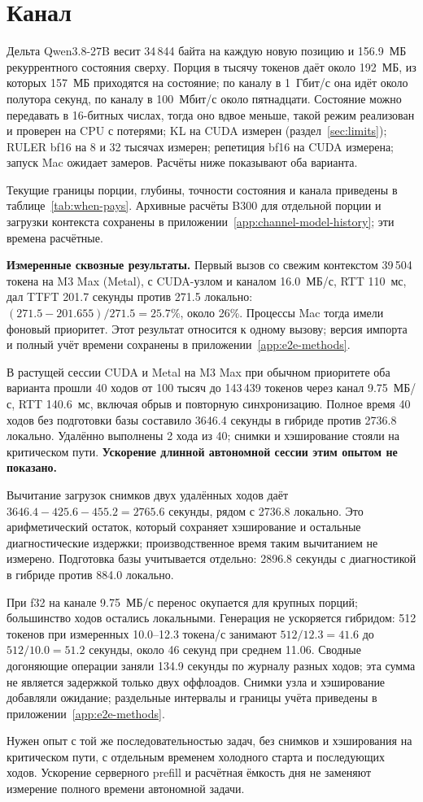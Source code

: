 \section{Канал}
\label{sec:channel}

Дельта Qwen3.8-27B весит 34\,844 байта на каждую новую позицию и 156.9~МБ рекуррентного состояния сверху. Порция в
тысячу токенов даёт около 192~МБ, из которых 157~МБ приходятся на состояние; по каналу в 1~Гбит/с она идёт около
полутора секунд, по каналу в 100~Мбит/с около пятнадцати. Состояние можно передавать в 16-битных числах, тогда оно
вдвое меньше, такой режим реализован и проверен на CPU с потерями; KL на CUDA измерен (раздел~\ref{sec:limits}); RULER bf16 на 8 и 32 тысячах измерен; репетиция bf16 на CUDA измерена; запуск Mac ожидает замеров.
Расчёты ниже показывают оба варианта.

Текущие границы порции, глубины, точности состояния и канала приведены в таблице~\ref{tab:when-pays}. Архивные расчёты B300 для отдельной порции и загрузки контекста сохранены в приложении~\ref{app:channel-model-history}; эти времена расчётные.

\textbf{Измеренные сквозные результаты.} Первый вызов со свежим контекстом 39\,504 токена
на M3 Max (Metal), с CUDA-узлом и каналом 16.0~МБ/с, RTT 110~мс, дал TTFT 201.7 секунды
против 271.5 локально: $(271.5-201.655)/271.5=25.7\%$, около 26\%.
Процессы Mac тогда имели фоновый приоритет. Этот результат относится к одному вызову;
версия импорта и полный учёт времени сохранены в приложении~\ref{app:e2e-methods}.

В растущей сессии CUDA и Metal на M3 Max при обычном приоритете оба варианта прошли 40 ходов
от 100 тысяч до 143\,439 токенов через канал 9.75~МБ/с, RTT 140.6~мс, включая обрыв и повторную синхронизацию.
Полное время 40 ходов без подготовки базы составило 3646.4 секунды в гибриде против 2736.8 локально.
Удалённо выполнены 2 хода из 40; снимки и хэширование стояли на критическом пути.
\textbf{Ускорение длинной автономной сессии этим опытом не показано.}

Вычитание загрузок снимков двух удалённых ходов даёт
$3646.4-425.6-455.2=2765.6$ секунды, рядом с 2736.8 локально.
Это арифметический остаток, который сохраняет хэширование и остальные диагностические издержки;
производственное время таким вычитанием не измерено. Подготовка базы учитывается отдельно:
2896.8 секунды с диагностикой в гибриде против 884.0 локально.

При f32 на канале 9.75~МБ/с перенос окупается для крупных порций; большинство ходов остались локальными.
Генерация не ускоряется гибридом: 512 токенов при измеренных 10.0--12.3 токена/с занимают
$512/12.3=41.6$ до $512/10.0=51.2$ секунды, около 46 секунд при среднем 11.06.
Сводные догоняющие операции заняли 134.9 секунды по журналу разных ходов;
эта сумма не является задержкой только двух оффлоадов. Снимки узла и хэширование добавляли ожидание;
раздельные интервалы и границы учёта приведены в приложении~\ref{app:e2e-methods}.

Нужен опыт с той же последовательностью задач, без снимков и хэширования на критическом пути,
с отдельным временем холодного старта и последующих ходов. Ускорение серверного prefill и расчётная ёмкость дня
не заменяют измерение полного времени автономной задачи.
